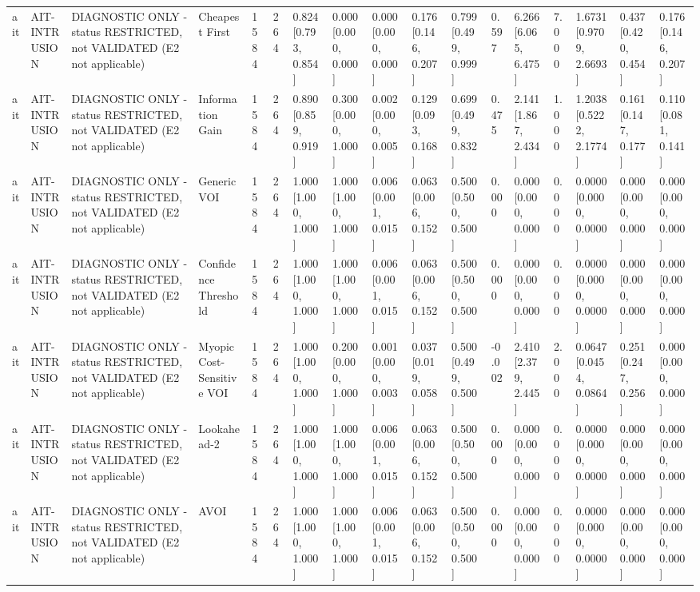 \begin{table}[!ht]
{\begin{tabular}{lllllllllllllllll}
ait & AIT-INTRUSION & DIAGNOSTIC ONLY - status RESTRICTED, not VALIDATED (E2 not applicable) & Cheapest First & 1584 & 264 & 0.824 [0.793, 0.854] & 0.000 [0.000, 0.000] & 0.000 [0.000, 0.000] & 0.176 [0.146, 0.207] & 0.799 [0.499, 0.999] & 0.597 & 6.266 [6.065, 6.475] & 7.000 & 1.6731 [0.9709, 2.6693] & 0.437 [0.420, 0.454] & 0.176 [0.146, 0.207] \\
ait & AIT-INTRUSION & DIAGNOSTIC ONLY - status RESTRICTED, not VALIDATED (E2 not applicable) & Information Gain & 1584 & 264 & 0.890 [0.859, 0.919] & 0.300 [0.000, 1.000] & 0.002 [0.000, 0.005] & 0.129 [0.093, 0.168] & 0.699 [0.499, 0.832] & 0.475 & 2.141 [1.867, 2.434] & 1.000 & 1.2038 [0.5222, 2.1774] & 0.161 [0.147, 0.177] & 0.110 [0.081, 0.141] \\
ait & AIT-INTRUSION & DIAGNOSTIC ONLY - status RESTRICTED, not VALIDATED (E2 not applicable) & Generic VOI & 1584 & 264 & 1.000 [1.000, 1.000] & 1.000 [1.000, 1.000] & 0.006 [0.001, 0.015] & 0.063 [0.006, 0.152] & 0.500 [0.500, 0.500] & 0.000 & 0.000 [0.000, 0.000] & 0.000 & 0.0000 [0.0000, 0.0000] & 0.000 [0.000, 0.000] & 0.000 [0.000, 0.000] \\
ait & AIT-INTRUSION & DIAGNOSTIC ONLY - status RESTRICTED, not VALIDATED (E2 not applicable) & Confidence Threshold & 1584 & 264 & 1.000 [1.000, 1.000] & 1.000 [1.000, 1.000] & 0.006 [0.001, 0.015] & 0.063 [0.006, 0.152] & 0.500 [0.500, 0.500] & 0.000 & 0.000 [0.000, 0.000] & 0.000 & 0.0000 [0.0000, 0.0000] & 0.000 [0.000, 0.000] & 0.000 [0.000, 0.000] \\
ait & AIT-INTRUSION & DIAGNOSTIC ONLY - status RESTRICTED, not VALIDATED (E2 not applicable) & Myopic Cost-Sensitive VOI & 1584 & 264 & 1.000 [1.000, 1.000] & 0.200 [0.000, 1.000] & 0.001 [0.000, 0.003] & 0.037 [0.019, 0.058] & 0.500 [0.499, 0.500] & -0.002 & 2.410 [2.379, 2.445] & 2.000 & 0.0647 [0.0454, 0.0864] & 0.251 [0.247, 0.256] & 0.000 [0.000, 0.000] \\
ait & AIT-INTRUSION & DIAGNOSTIC ONLY - status RESTRICTED, not VALIDATED (E2 not applicable) & Lookahead-2 & 1584 & 264 & 1.000 [1.000, 1.000] & 1.000 [1.000, 1.000] & 0.006 [0.001, 0.015] & 0.063 [0.006, 0.152] & 0.500 [0.500, 0.500] & 0.000 & 0.000 [0.000, 0.000] & 0.000 & 0.0000 [0.0000, 0.0000] & 0.000 [0.000, 0.000] & 0.000 [0.000, 0.000] \\
ait & AIT-INTRUSION & DIAGNOSTIC ONLY - status RESTRICTED, not VALIDATED (E2 not applicable) & AVOI & 1584 & 264 & 1.000 [1.000, 1.000] & 1.000 [1.000, 1.000] & 0.006 [0.001, 0.015] & 0.063 [0.006, 0.152] & 0.500 [0.500, 0.500] & 0.000 & 0.000 [0.000, 0.000] & 0.000 & 0.0000 [0.0000, 0.0000] & 0.000 [0.000, 0.000] & 0.000 [0.000, 0.000] \\
\bottomrule
\end{tabular}}
\end{table}
